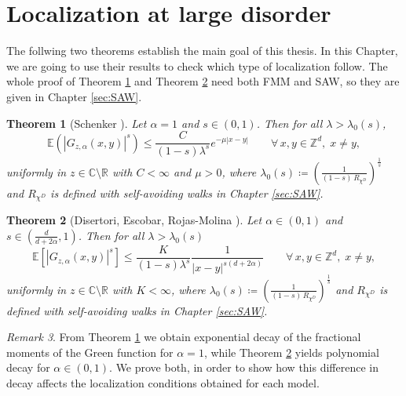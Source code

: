 \documentclass[11pt, a4paper, UKenglish, oneside]{book}
\theoremstyle{plain}
\newtheorem{theorem}{Theorem}
\theoremstyle{remark}
\newtheorem{remark}[theorem]{Remark}
\theoremstyle{definition}
\numberwithin{equation}{section}
\numberwithin{theorem}{section}
\begin{document}
\section{Localization at large disorder}
The follwing two theorems establish the main goal of this thesis. In this Chapter, we are going to use their results to check which type of localization follow. The whole proof of Theorem \ref{thm:theorem1.1} and Theorem \ref{thm:theorem1.2} need both FMM and SAW, so they are given in Chapter \ref{sec:SAW}.
\begin{theorem}[Schenker \cite{schenker2015}] \label{thm:theorem1.1}
Let $\alpha =1 $ and $s \in (0,1)$. Then for all $\lambda > \lambda_0(s)$,
\begin{equation}
\mathbb{E}\left(| G_{z, \alpha}(x,y)|^s\right) \le \frac{C}{(1-s)\lambda^s} e^{-\mu|x - y|}\qquad \forall\, x, y \in \mathbb{Z}^{d},\; x \ne y,\label{eq:schenkerbound}
\end{equation}
uniformly in $z \in \mathbb{C}\setminus \mathbb{R}$ with $C < \infty$ and $\mu >0$, where $\lambda_0(s) \coloneqq \left(\frac{1}{(1-s)\, R_{\chi^D}}\right)^{\frac{1}{s}}$ and $R_{\chi^D}$ is defined with self-avoiding walks in Chapter \ref{sec:SAW}.
\end{theorem}

\begin{theorem}[Disertori, Escobar, Rojas-Molina \cite{disertori2024}]\label{thm:theorem1.2}
    Let $\alpha \in (0,1)$ and $s \in (\frac{d}{d+2\alpha},1)$. Then for all $\lambda > \lambda_0(s)$
    \begin{equation}
    \mathbb{E}[| G_{z,\alpha}(x,y)|^{s}] \le \frac{K}{(1-s)\lambda^{s}} \frac{1}{|x-y|^{s(d+2\alpha)}} \qquad \forall\, x, y \in \mathbb{Z}^{d},\; x \ne y, \label{eq:LRSAW}
    \end{equation}
uniformly in $z \in \mathbb{C} \setminus \mathbb{R}$ with $K < \infty$, where $\lambda_0(s) \coloneqq \left(\frac{1}{(1-s)\, R_{\chi^D}}\right)^{\frac{1}{s}}$ and $R_{\chi^D}$ is defined with self-avoiding walks in Chapter \ref{sec:SAW}.
\end{theorem}
\begin{remark}
From Theorem \ref{thm:theorem1.1} we obtain exponential decay of the fractional moments of the Green function for $\alpha = 1$, while Theorem \ref{thm:theorem1.2} yields polynomial decay for $\alpha \in (0,1)$. We prove both, in order to show how this difference in decay affects the localization conditions obtained for each model.
\end{remark}
\end{document}
